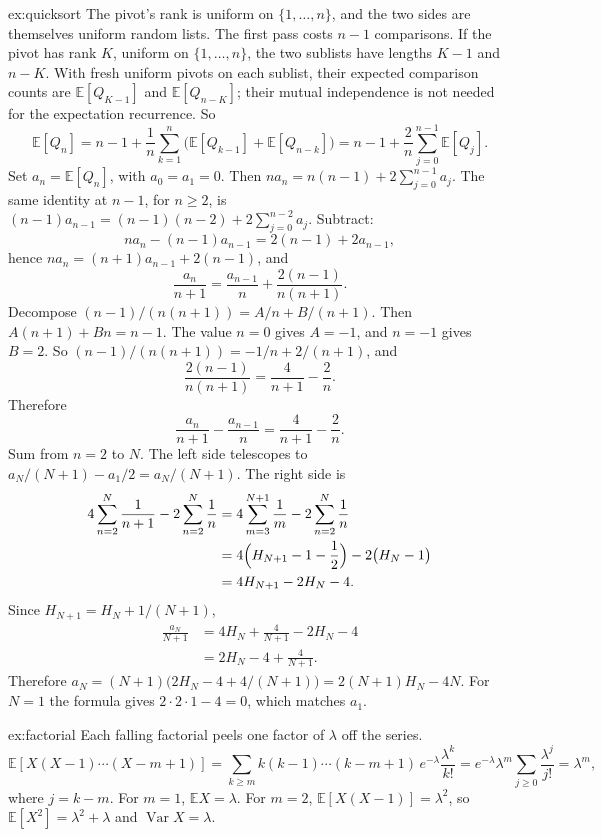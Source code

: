 \begin{solution}{ex:quicksort}
\idea The pivot's rank is uniform on $\{1,\ldots,n\}$, and the two sides are themselves uniform random lists.
\writeup The first pass costs $n-1$ comparisons. If the pivot has rank $K$, uniform on $\{1,\ldots,n\}$, the two sublists have lengths $K-1$ and $n-K$. With fresh uniform pivots on each sublist, their expected comparison counts are $\mathbb E[Q_{K-1}]$ and $\mathbb E[Q_{n-K}]$; their mutual independence is not needed for the expectation recurrence. So
\[
 \mathbb E[Q_n]=n-1+\frac1n\sum_{k=1}^n\bigl(\mathbb E[Q_{k-1}]+\mathbb E[Q_{n-k}]\bigr)
 =n-1+\frac2n\sum_{j=0}^{n-1}\mathbb E[Q_j].
\]
Set $a_n=\mathbb E[Q_n]$, with $a_0=a_1=0$. Then $na_n=n(n-1)+2\sum_{j=0}^{n-1}a_j$. The same identity at $n-1$, for $n\ge2$, is $(n-1)a_{n-1}=(n-1)(n-2)+2\sum_{j=0}^{n-2}a_j$. Subtract:
\[
 na_n-(n-1)a_{n-1}=2(n-1)+2a_{n-1},
\]
hence $na_n=(n+1)a_{n-1}+2(n-1)$, and
\[
 \frac{a_n}{n+1}=\frac{a_{n-1}}{n}+\frac{2(n-1)}{n(n+1)}.
\]
Decompose $(n-1)/(n(n+1))=A/n+B/(n+1)$. Then $A(n+1)+Bn=n-1$. The value $n=0$ gives $A=-1$, and $n=-1$ gives $B=2$. So $(n-1)/(n(n+1))=-1/n+2/(n+1)$, and
\[
 \frac{2(n-1)}{n(n+1)}=\frac{4}{n+1}-\frac{2}{n}.
\]
Therefore
\[
 \frac{a_n}{n+1}-\frac{a_{n-1}}{n}=\frac{4}{n+1}-\frac{2}{n}.
\]
Sum from $n=2$ to $N$. The left side telescopes to $a_N/(N+1)-a_1/2=a_N/(N+1)$. The right side is
\begin{align*}
 4\sum_{n=2}^N\frac1{n+1}-2\sum_{n=2}^N\frac1n
 &=4\sum_{m=3}^{N+1}\frac1m-2\sum_{n=2}^N\frac1n\\
 &=4\Bigl(H_{N+1}-1-\frac12\Bigr)-2\bigl(H_N-1\bigr)\\
 &=4H_{N+1}-2H_N-4.
\end{align*}
Since $H_{N+1}=H_N+1/(N+1)$,
\begin{align*}
 \frac{a_N}{N+1}
 &=4H_N+\frac4{N+1}-2H_N-4\\
 &=2H_N-4+\frac4{N+1}.
\end{align*}
Therefore $a_N=(N+1)\bigl(2H_N-4+4/(N+1)\bigr)=2(N+1)H_N-4N$. For $N=1$ the formula gives $2\cdot2\cdot1-4=0$, which matches $a_1$.
\end{solution}

\begin{solution}{ex:factorial}
\idea Each falling factorial peels one factor of $\lambda$ off the series.
\writeup 
\[
 \mathbb E[X(X-1)\cdots(X-m+1)]
 =\sum_{k\ge m}k(k-1)\cdots(k-m+1)\,e^{-\lambda}\frac{\lambda^k}{k!}
 =e^{-\lambda}\lambda^m\sum_{j\ge0}\frac{\lambda^j}{j!}=\lambda^m,
\]
where $j=k-m$. For $m=1$, $\mathbb EX=\lambda$. For $m=2$, $\mathbb E[X(X-1)]=\lambda^2$, so $\mathbb E[X^2]=\lambda^2+\lambda$ and $\operatorname{Var}X=\lambda$.
\end{solution}

